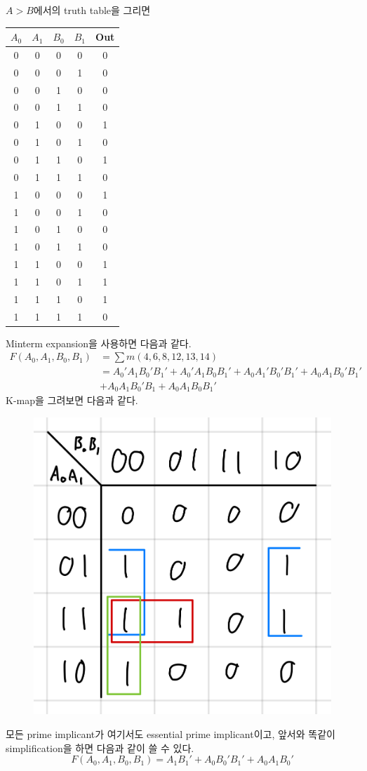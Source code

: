 \documentclass{scrartcl}
\begin{document}
\(A > B\)에서의 truth table을 그리면
\begin{table}[H]
  \centering
  \begin{tabular}{|cccc|c|}
  \hline
  \(A_0\) & \(A_1\) & \(B_0\) & \(B_1\) & Out \\ \hline
  0       & 0       & 0       & 0       & 0   \\
  0       & 0       & 0       & 1       & 0   \\
  0       & 0       & 1       & 0       & 0   \\
  0       & 0       & 1       & 1       & 0   \\
  0       & 1       & 0       & 0       & 1   \\
  0       & 1       & 0       & 1       & 0   \\
  0       & 1       & 1       & 0       & 1   \\
  0       & 1       & 1       & 1       & 0   \\
  1       & 0       & 0       & 0       & 1   \\
  1       & 0       & 0       & 1       & 0   \\
  1       & 0       & 1       & 0       & 0   \\
  1       & 0       & 1       & 1       & 0   \\
  1       & 1       & 0       & 0       & 1   \\
  1       & 1       & 0       & 1       & 1   \\
  1       & 1       & 1       & 0       & 1   \\
  1       & 1       & 1       & 1       & 0   \\ \hline
  \end{tabular}
\end{table}

Minterm expansion을 사용하면 다음과 같다.
\begin{align*}
  F(A_0, A_1, B_0, B_1) &= \sum m(4, 6, 8, 12, 13, 14) \\
                        &= A_0' A_1 B_0' B_1' + A_0' A_1 B_0 B_1' + A_0 A_1' B_0' B_1' + A_0 A_1 B_0' B_1' \\
                        &+ A_0 A_1 B_0' B_1 + A_0 A_1 B_0 B_1'
\end{align*}
K-map을 그려보면 다음과 같다.
\begin{figure}[H]
  \centering
  \includegraphics[width=0.4\linewidth]{GT_KM}
\end{figure}
모든 prime implicant가 여기서도 essential prime implicant이고, 앞서와 똑같이 simplification을 하면 다음과 같이 쓸 수 있다.
\[
  F(A_0, A_1, B_0, B_1) = A_1 B_1' + A_0 B_0' B_1' + A_0 A_1 B_0'
\]
\end{document}
